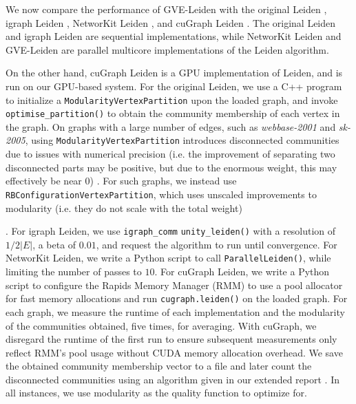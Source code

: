 We now compare the performance of GVE-Leiden with the original Leiden \cite{com-traag19}, igraph Leiden \cite{csardi2006igraph}, NetworKit Leiden \cite{staudt2016networkit}, and cuGraph Leiden \cite{kang2023cugraph}. The original Leiden and igraph Leiden are sequential implementations, while NetworKit Leiden and GVE-Leiden are parallel multicore implementations of the Leiden algorithm. On the other hand, cuGraph Leiden is a GPU implementation of Leiden, and is run on our GPU-based system. For the original Leiden, we use a C++ program to initialize a \texttt{ModularityVertexPartition} upon the loaded graph, and invoke \texttt{optimise\_partition()} to obtain the community membership of each vertex in the graph. On graphs with a large number of edges, such as \textit{webbase-2001} and \textit{sk-2005}, using \texttt{ModularityVertexPartition} introduces disconnected communities due to issues with numerical precision (i.e. the improvement of separating two disconnected parts may be positive, but due to the enormous weight, this may effectively be near 0) \cite{traag2024leiden}. For such graphs, we instead use \texttt{RBConfigurationVertexPartition}, which uses unscaled improvements to modularity (i.e. they do not scale with the total weight). For igraph Leiden, we use \texttt{igraph\_comm} \texttt{unity\_leiden()} with a resolution of $1/2|E|$, a beta of $0.01$, and request the algorithm to run until convergence. For NetworKit Leiden, we write a Python script to call \texttt{ParallelLeiden()}, while limiting the number of passes to $10$. For cuGraph Leiden, we write a Python script to configure the Rapids Memory Manager (RMM) to use a pool allocator for fast memory allocations and run \texttt{cugraph.leiden()} on the loaded graph. For each graph, we measure the runtime of each implementation and the modularity of the communities obtained, five times, for averaging. With cuGraph, we disregard the runtime of the first run to ensure subsequent measurements only reflect RMM's pool usage without CUDA memory allocation overhead. We save the obtained community membership vector to a file and later count the disconnected communities using an algorithm given in our extended report \cite{report}. In all instances, we use modularity as the quality function to optimize for.

